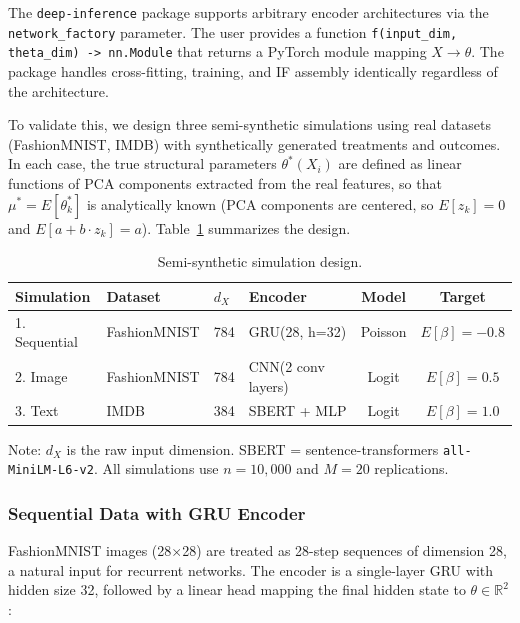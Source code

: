 The \texttt{deep-inference} package supports arbitrary encoder architectures via the \texttt{network\_factory} parameter. The user provides a function \texttt{f(input\_dim, theta\_dim) -> nn.Module} that returns a PyTorch module mapping $X \to \theta$. The package handles cross-fitting, training, and IF assembly identically regardless of the architecture.

To validate this, we design three semi-synthetic simulations using real datasets (FashionMNIST, IMDB) with synthetically generated treatments and outcomes. In each case, the true structural parameters $\theta^*(X_i)$ are defined as linear functions of PCA components extracted from the real features, so that $\mu^* = E[\theta^*_k]$ is analytically known (PCA components are centered, so $E[z_k] = 0$ and $E[a + b \cdot z_k] = a$). Table~\ref{tab:semi_synthetic_design} summarizes the design.

\begin{table}[ht]
\centering
\caption{Semi-synthetic simulation design.}\label{tab:semi_synthetic_design}
\begin{tabular}{llllcc}
\toprule
\textbf{Simulation} & \textbf{Dataset} & $d_X$ & \textbf{Encoder} & \textbf{Model} & \textbf{Target} \\
\midrule
1. Sequential & FashionMNIST & 784 & GRU(28, h=32) & Poisson & $E[\beta] = -0.8$ \\
2. Image      & FashionMNIST & 784 & CNN(2 conv layers) & Logit & $E[\beta] = 0.5$ \\
3. Text       & IMDB         & 384 & SBERT + MLP   & Logit & $E[\beta] = 1.0$ \\
\bottomrule
\end{tabular}
\begin{tablenotes}\small
\item Note: $d_X$ is the raw input dimension. SBERT = sentence-transformers \texttt{all-MiniLM-L6-v2}. All simulations use $n = 10{,}000$ and $M = 20$ replications.
\end{tablenotes}
\end{table}

\subsubsection{Sequential Data with GRU Encoder}

FashionMNIST images (28$\times$28) are treated as 28-step sequences of dimension 28, a natural input for recurrent networks. The encoder is a single-layer GRU with hidden size 32, followed by a linear head mapping the final hidden state to $\theta \in \mathbb{R}^2$:

